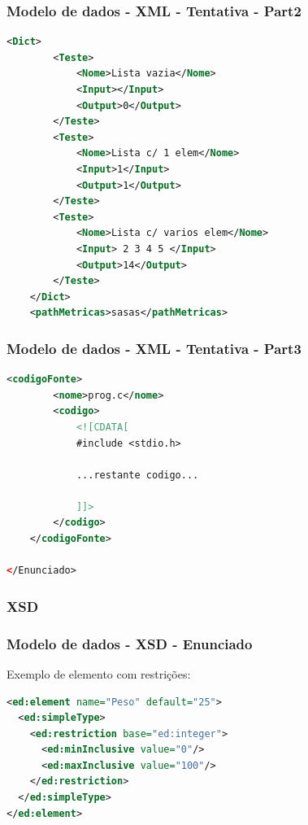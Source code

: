 \documentclass{beamer}
\begin{document}
\begin{frame}[fragile] \frametitle{Modelo de dados - XML - Tentativa - Part2}
\begin{lstlisting}[language=XML,basicstyle=\tiny,breaklines=true]
    <Dict>
        <Teste>
            <Nome>Lista vazia</Nome>
            <Input></Input>
            <Output>0</Output>
        </Teste>
        <Teste>
            <Nome>Lista c/ 1 elem</Nome>
            <Input>1</Input>
            <Output>1</Output>
        </Teste>
        <Teste>
            <Nome>Lista c/ varios elem</Nome>
            <Input> 2 3 4 5 </Input>
            <Output>14</Output>
        </Teste>
    </Dict>
    <pathMetricas>sasas</pathMetricas>
\end{lstlisting}
\end{frame}

\begin{frame}[fragile] \frametitle{Modelo de dados - XML - Tentativa - Part3}
\begin{lstlisting}[language=XML,basicstyle=\tiny,breaklines=true]
    <codigoFonte>
        <nome>prog.c</nome>
        <codigo>
            <![CDATA[
            #include <stdio.h>
            
            ...restante codigo...
            
            ]]>
        </codigo>
    </codigoFonte>
        
</Enunciado>
\end{lstlisting}
\end{frame}

\subsubsection{XSD}
\begin{frame}[fragile] \frametitle{Modelo de dados - XSD - Enunciado}
Exemplo de elemento com restrições:\\
\begin{lstlisting}[language=XML,basicstyle=\tiny,breaklines=true]
<ed:element name="Peso" default="25">
  <ed:simpleType>
    <ed:restriction base="ed:integer">
      <ed:minInclusive value="0"/>
      <ed:maxInclusive value="100"/>
    </ed:restriction>
  </ed:simpleType>
</ed:element>
\end{lstlisting}
\end{frame}
\end{document}
